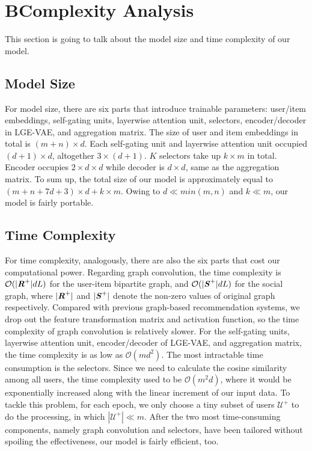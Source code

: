 \documentclass[letterpaper]{article} %
\begin{document}
\section{B{\quad}Complexity Analysis}
This section is going to talk about the model size and time complexity of our model.
\subsection{Model Size}
For model size, there are six parts that introduce trainable parameters: user/item embeddings, self-gating units, layerwise attention unit, selectors, encoder/decoder in LGE-VAE, and aggregation matrix. The size of user and item embeddings in total is $(m+n)\times d$. Each self-gating unit and layerwise attention unit occupied $(d+1)\times d$, altogether $3\times (d+1)$. $K$ selectors take up $k\times m$ in total. Encoder occupies $2\times d\times d$ while decoder is $d\times d$, same as the aggregation matrix. To sum up, the total size of our model is approximately equal to $(m+n+7d+3)\times d+ k\times m$. Owing to $d\ll min(m,n)$ and $k\ll m$, our model is fairly portable.
\subsection{Time Complexity}
For time complexity, analogously, there are also the six parts that cost our computational power. Regarding graph convolution, the time complexity is $\mathcal{O}(|\textbf{\textit{R}}^+|dL)$ for the user-item bipartite graph, and $\mathcal{O}(|\textbf{\textit{S}}^+|dL)$ for the social graph, where $|\textbf{\textit{R}}^+|$ and $|\textbf{\textit{S}}^+|$ denote the non-zero values of original graph respectively. Compared with previous graph-based recommendation systems, we drop out the feature transformation matrix and activation function, so the time complexity of graph convolution is relatively slower. For the self-gating units, layerwise attention unit, encoder/decoder of LGE-VAE, and aggregation matrix, the time complexity is as low as $\mathcal{O}(md^2)$. The most intractable time consumption is the selectors. Since we need to calculate the cosine similarity among all users, the time complexity used to be $\mathcal{O}(m^2d)$, where it would be exponentially increased along with the linear increment of our input data. To tackle this problem, for each epoch, we only choose a tiny subset of users $\mathcal{U}^+$ to do the processing, in which $|\mathcal{U}^+| \ll m$. After the two most time-consuming components, namely graph convolution and selectors, have been tailored without spoiling the effectiveness, our model is fairly efficient, too.
\end{document}
